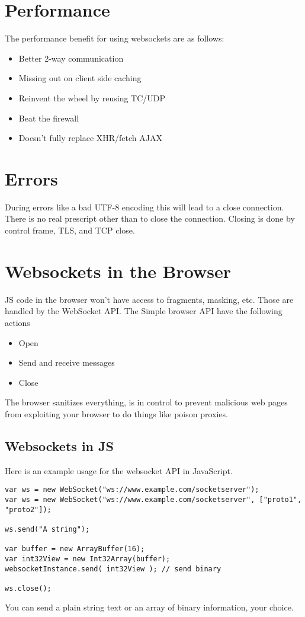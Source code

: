 \documentclass[../CMPUT-404-Notes.tex]{subfiles}
\begin{document}
\section{Performance}
The performance benefit for using websockets are as follows:
\begin{itemize}
    \item Better 2-way communication
    \item Missing out on client side caching 
    \item Reinvent the wheel by reusing TC/UDP
    \item Beat the firewall 
    \item Doesn't fully replace XHR/fetch AJAX  
\end{itemize}

\section{Errors}
During errors like a bad UTF-8 encoding this will lead to a close connection. 
There is no real prescript other than to close the connection.
Closing is done by control frame, TLS, and TCP close.

\section{Websockets in the Browser}
JS code in the browser won't have access to fragments, masking, etc.
Those are handled by the WebSocket API.
The Simple browser API have the following actions
\begin{itemize}
    \item Open 
    \item Send and receive messages 
    \item Close
\end{itemize}
The browser sanitizes everything, is in control to prevent malicious web pages from exploiting your browser to do things like poison proxies.

\subsection{Websockets in JS}
Here is an example usage for the websocket API in JavaScript.
\begin{verbatim}
var ws = new WebSocket("ws://www.example.com/socketserver");
var ws = new WebSocket("ws://www.example.com/socketserver", ["proto1", "proto2"]);

ws.send("A string");

var buffer = new ArrayBuffer(16);
var int32View = new Int32Array(buffer);
websocketInstance.send( int32View ); // send binary

ws.close(); 
\end{verbatim}

You can send a plain string text or an array of binary information, your choice.
\end{document}

